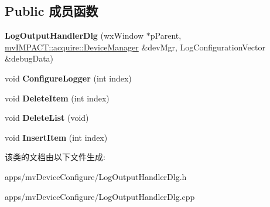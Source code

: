 \subsection*{Public 成员函数}
\begin{DoxyCompactItemize}
\item 
\hypertarget{class_log_output_handler_dlg_aab0d127ef531865da64a8fb4a7415dd2}{{\bfseries Log\+Output\+Handler\+Dlg} (wx\+Window $\ast$p\+Parent, \hyperlink{classmv_i_m_p_a_c_t_1_1acquire_1_1_device_manager}{mv\+I\+M\+P\+A\+C\+T\+::acquire\+::\+Device\+Manager} \&dev\+Mgr, Log\+Configuration\+Vector \&debug\+Data)}\label{class_log_output_handler_dlg_aab0d127ef531865da64a8fb4a7415dd2}

\item 
\hypertarget{class_log_output_handler_dlg_afe69a33adee70df0a69f1738527aedee}{void {\bfseries Configure\+Logger} (int index)}\label{class_log_output_handler_dlg_afe69a33adee70df0a69f1738527aedee}

\item 
\hypertarget{class_log_output_handler_dlg_ab832d795a382f71c985a147c19a678fd}{void {\bfseries Delete\+Item} (int index)}\label{class_log_output_handler_dlg_ab832d795a382f71c985a147c19a678fd}

\item 
\hypertarget{class_log_output_handler_dlg_ac690796f16fc6ed6998e3826102d8af1}{void {\bfseries Delete\+List} (void)}\label{class_log_output_handler_dlg_ac690796f16fc6ed6998e3826102d8af1}

\item 
\hypertarget{class_log_output_handler_dlg_aea7f13302f3622c6a9d13093ab0803f4}{void {\bfseries Insert\+Item} (int index)}\label{class_log_output_handler_dlg_aea7f13302f3622c6a9d13093ab0803f4}

\end{DoxyCompactItemize}


该类的文档由以下文件生成\+:\begin{DoxyCompactItemize}
\item 
apps/mv\+Device\+Configure/Log\+Output\+Handler\+Dlg.\+h\item 
apps/mv\+Device\+Configure/Log\+Output\+Handler\+Dlg.\+cpp\end{DoxyCompactItemize}
